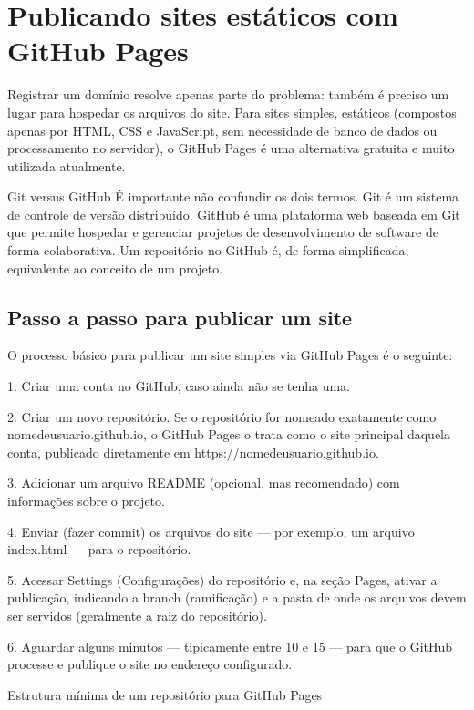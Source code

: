 \section{Publicando sites estáticos com GitHub Pages}

Registrar um domínio resolve apenas parte do problema: também é preciso um lugar para hospedar os arquivos do site. Para sites simples, estáticos (compostos apenas por HTML, CSS e JavaScript, sem necessidade de banco de dados ou processamento no servidor), o GitHub Pages é uma alternativa gratuita e muito utilizada atualmente.

\begin{infobox}{Git versus GitHub}
É importante não confundir os dois termos. Git é um sistema de controle de versão distribuído. GitHub é uma plataforma web baseada em Git que permite hospedar e gerenciar projetos de desenvolvimento de software de forma colaborativa. Um repositório no GitHub é, de forma simplificada, equivalente ao conceito de um projeto.
\end{infobox}

\subsection{Passo a passo para publicar um site}

O processo básico para publicar um site simples via GitHub Pages é o seguinte:

1. Criar uma conta no GitHub, caso ainda não se tenha uma.

2. Criar um novo repositório. Se o repositório for nomeado exatamente como nomedeusuario.github.io, o GitHub Pages o trata como o site principal daquela conta, publicado diretamente em https://nomedeusuario.github.io.

3. Adicionar um arquivo README (opcional, mas recomendado) com informações sobre o projeto.

4. Enviar (fazer commit) os arquivos do site — por exemplo, um arquivo index.html — para o repositório.

5. Acessar Settings (Configurações) do repositório e, na seção Pages, ativar a publicação, indicando a branch (ramificação) e a pasta de onde os arquivos devem ser servidos (geralmente a raiz do repositório).

6. Aguardar alguns minutos — tipicamente entre 10 e 15 — para que o GitHub processe e publique o site no endereço configurado.

Estrutura mínima de um repositório para GitHub Pages

